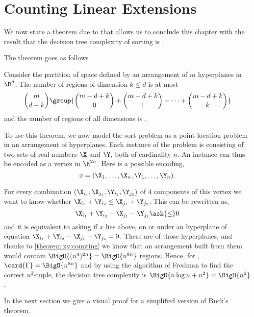 \section{Counting Linear Extensions}
\label{tree:xy:counting}

We now state a theorem due to \citet*{buck:1943} that allows us to conclude
this chapter with the result that the decision tree complexity of sorting \XY
is .

The theorem goes as follows
\begin{theorem}\label{theorem:xy:counting}
Consider the partition of space defined by an arrangement of $m$ hyperplanes in
$\R^d$.
The number of regions of dimension $k \le d$ is at most
\begin{displaymath}
\binom{m}{d-k} \group{ \binom{m-d+k}{0} + \binom{m-d+k}{1} + \cdots + \binom{m-d+k}{k} }
\end{displaymath}
and the number of regions of all dimensions is .
\end{theorem}

To use this theorem, we now model the sort \XY problem as a point location problem in an
arrangement of hyperplanes. Each instance of the problem is consisting of two
sets of real numbers $\X$ and $\Y$, both of cardinality $n$. An instance can
thus be encoded as a vertex in $\R^{2n}$. Here is a possible encoding,
\begin{displaymath}
x = (\X_1, \ldots, \X_n, \Y_1, \ldots, \Y_n).
\end{displaymath}

For every combination $(\X_{i_1}, \X_{j_1}, \Y_{i_2}, \Y_{j_2})$ of $4$
components of this vertex we want to know whether $\X_{i_1} + \Y_{i_2} \le
\X_{j_1} + \Y_{j_2}$. This can be rewritten as,
$$\X_{i_1} + \Y_{i_2} - \X_{j_1} - \Y_{j_2} \ask{\le} 0$$
and it is equivalent to asking if $x$ lies above, on or under an
hyperplane of equation $\X_{i_1} + \Y_{i_2} - \X_{j_1} - \Y_{j_2} = 0$. There
are  of those hyperplanes, and thanks to \ref{theorem:xy:counting}
we know that an arrangement built from them would contain
$\BigO{(n^4)^{2n}} = \BigO{n^{8n}}$ regions. Hence, for \XY, $\card{\Gamma} =
\BigO{n^{8n}}$ and by using the algorithm of Fredman to find the correct
$n^2$-tuple, the decision tree complexity is
$\BigO{n \log n + n^2} = \BigO{n^2}$.

In the next section we give a visual proof for a simplified version of
Buck's theorem.
